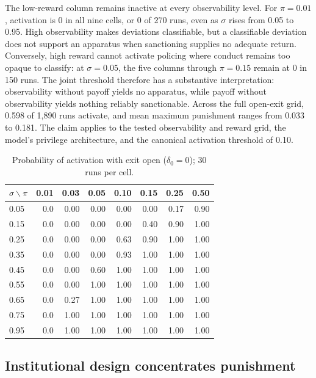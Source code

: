 \documentclass[12pt]{article}
\begin{document}
The low-reward column remains inactive at every observability level. For \(\pi=0.01\),
activation is 0 in all nine cells, or 0 of 270 runs, even as \(\sigma\) rises from 0.05 to 0.95.
High observability makes deviations classifiable, but a classifiable deviation does not support
an apparatus when sanctioning supplies no adequate return. Conversely, high reward cannot
activate policing where conduct remains too opaque to classify: at \(\sigma=0.05\), the five
columns through \(\pi=0.15\) remain at 0 in 150 runs. The joint threshold therefore has a
substantive interpretation: observability without payoff yields no apparatus, while payoff
without observability yields nothing reliably sanctionable. Across the full open-exit grid,
0.598 of 1,890 runs activate, and mean maximum punishment ranges from 0.033 to 0.181. The claim
applies to the tested observability and reward grid, the model's privilege architecture, and the
canonical activation threshold of 0.10.

\begin{table}[htbp]
\centering
\caption{Probability of activation with exit open ($\delta_0=0$); 30 runs per cell.}
\label{tab:activation-frontier}
\begin{tabular}{lrrrrrrr}
\hline
$\sigma\backslash\pi$ & 0.01 & 0.03 & 0.05 & 0.10 & 0.15 & 0.25 & 0.50 \\
\hline
0.05 & 0.0 & 0.00 & 0.00 & 0.00 & 0.00 & 0.17 & 0.90 \\
0.15 & 0.0 & 0.00 & 0.00 & 0.00 & 0.40 & 0.90 & 1.00 \\
0.25 & 0.0 & 0.00 & 0.00 & 0.63 & 0.90 & 1.00 & 1.00 \\
0.35 & 0.0 & 0.00 & 0.00 & 0.93 & 1.00 & 1.00 & 1.00 \\
0.45 & 0.0 & 0.00 & 0.60 & 1.00 & 1.00 & 1.00 & 1.00 \\
0.55 & 0.0 & 0.00 & 1.00 & 1.00 & 1.00 & 1.00 & 1.00 \\
0.65 & 0.0 & 0.27 & 1.00 & 1.00 & 1.00 & 1.00 & 1.00 \\
0.75 & 0.0 & 1.00 & 1.00 & 1.00 & 1.00 & 1.00 & 1.00 \\
0.95 & 0.0 & 1.00 & 1.00 & 1.00 & 1.00 & 1.00 & 1.00 \\
\hline
\end{tabular}
\end{table}

\subsection{Institutional design concentrates punishment}
\end{document}
